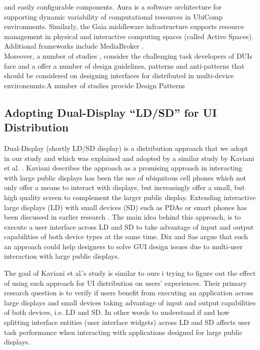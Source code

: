 and easily configurable components. Aura \cite{sousa2002aura} is a software architecture for supporting dynamic variability of computational resources in UbiComp environments.
Similarly, the Gaia \cite{roman2002middleware} middleware infrastructure supports resource
management in physical and interactive computing spaces (called Active Spaces). Additional
frameworks include MediaBroker \cite{modahl2004mediabroker}.\\
Moreover, a number of studies \cite{seifried2011lessons},
\cite{vanderdonckt2010distributed} consider the challenging task developers of
DUIs face and a offer a number of design guidelines, patterns and anti-patterns that should be considered on designing interfaces for distributed in multi-device environemnts.A number of studies provide Design Patterns\\

\subsection{Adopting Dual-Display ``LD/SD'' for UI Distribution}
Dual-Display (shortly LD/SD display) is a distribution approach that we adopt in
our study and which was explained and adopted by a similar study by Kaviani et al.
\cite{kaviani2011dual}. Kaviani describes the approach as a promising approach
in interacting with large public displays has been the use of ubiquitous cell phones which not only offer a means to interact with displays, but increasingly offer a small, but high quality screen to complement
the larger public display. Extending interactive large displays (LD) with small
devices (SD) such as PDAs or smart phones has been discussed in earlier research
\cite{dix2008public}. The main idea behind this approach, is to execute a user
interface across LD and SD to take advantage of input and output capabilities of
both device types at the same time. Dix and Sas \cite{dix2008public} argue that
such an approach could help designers to solve GUI design issues due to
multi-user interaction with large public displays. 

The goal of Kaviani et al.'s study is similar to ours i trying to figure out
the effect of using such approach for UI distribution on users' experiences.
Their primary research question is to verify if users benefit from executing an application across large displays and small devices taking advantage of input
and output capabilities of both devices, i.e. LD and SD. In other words to understand if and how splitting interface entities (user interface widgets) across LD and SD affects user task performance when interacting with applications designed for large public displays.\\


